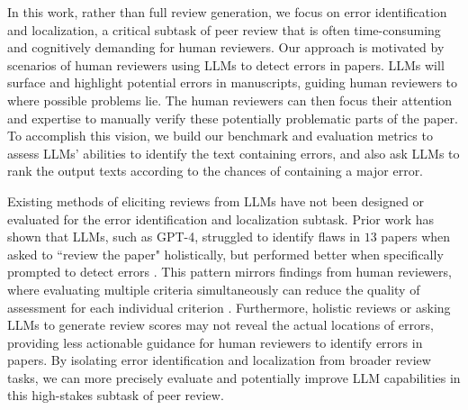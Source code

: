 \documentclass{article}
\begin{document}
In this work, rather than full review generation, we focus on error identification and localization, a critical subtask of peer review that is often time-consuming and cognitively demanding for human reviewers. Our approach is motivated by scenarios of human reviewers using LLMs to detect errors in papers. LLMs will surface and highlight potential errors in manuscripts, guiding  human reviewers to where possible problems lie. The human reviewers can then focus their attention and expertise to manually verify these potentially problematic parts of the paper. To accomplish this vision, we build our benchmark and evaluation metrics to assess LLMs' abilities to identify the text containing errors, and also ask LLMs to rank the output texts according to the chances of containing a major error.

Existing methods of eliciting reviews from LLMs have not been designed or evaluated for the error identification and localization subtask. Prior work has shown that LLMs, such as GPT-4, struggled to identify flaws in $13$ papers when asked to ``review the paper" holistically, but performed better when specifically prompted to detect errors \citep{liu2023}. This pattern mirrors findings from human reviewers, where evaluating multiple criteria simultaneously can reduce the quality of assessment for each individual criterion \citep{lane2024}. Furthermore, holistic reviews or asking LLMs to generate review scores may not reveal the actual locations of errors, providing less actionable guidance for human reviewers to identify errors in papers. By isolating error identification and localization from broader review tasks, we can more precisely evaluate and potentially improve LLM capabilities in this high-stakes subtask of peer review.
\end{document}
